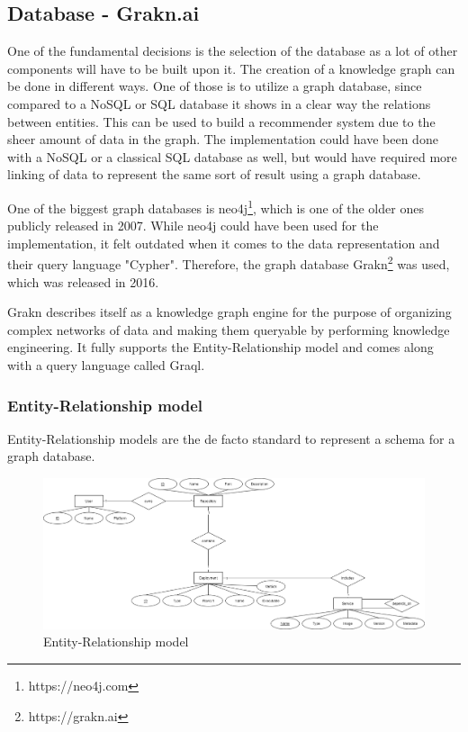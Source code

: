 \subsection{Database - Grakn.ai}
One of the fundamental decisions is the selection of the database as a lot of other components will have to be built upon it. The creation of a knowledge graph can be done in different ways. One of those is to utilize a graph database, since compared to a NoSQL or SQL database it shows in a clear way the relations between entities. This can be used to build a recommender system due to the sheer amount of data in the graph. The implementation could have been done with a NoSQL or a classical SQL database as well, but would have required more linking of data to represent the same sort of result using a graph database.


One of the biggest graph databases is neo4j\footnote{https://neo4j.com}, which is one of the older ones publicly released in 2007. While neo4j could have been used for the implementation, it felt outdated when it comes to the data representation and their query language "Cypher". Therefore, the graph database Grakn\footnote{https://grakn.ai} was used, which was released in 2016.

Grakn describes itself as a knowledge graph engine for the purpose of organizing complex networks of data and making them queryable by performing knowledge engineering. It fully supports the Entity-Relationship model and comes along with a query language called Graql. 

\subsubsection{Entity-Relationship model}
Entity-Relationship models are the de facto standard to represent a schema for a graph database.
\begin{figure}[H]
    \centering
    \includegraphics[width=1.2\paperwidth,height=1.2\paperheight,keepaspectratio,angle=270]{graphics/er_database.png}
    \caption{Entity-Relationship model}
    \label{fig:er_model}
\end{figure}

